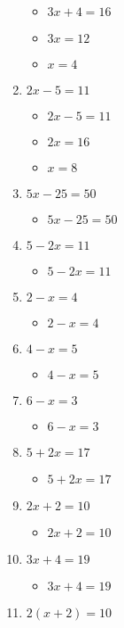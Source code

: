 \begin{enumerate}
  \begin{itemize}
  \item $3x+4=16$
  \item $3x=12$
  \item $x=4$
  \end{itemize}
\item $2x-5=11$
  \begin{itemize}
  \item $2x-5=11$
  \item $2x=16$
  \item $x=8$
  \end{itemize}
\item $5x-25=50$
  \begin{itemize}
  \item $5x-25=50$
  \end{itemize}
\item $5-2x=11$
  \begin{itemize}
  \item $5-2x=11$
  \end{itemize}
\item $2-x=4$
  \begin{itemize}
  \item $2-x=4$
  \end{itemize}
\item $4-x=5$
  \begin{itemize}
  \item $4-x=5$
  \end{itemize}
\item $6-x=3$
  \begin{itemize}
  \item $6-x=3$
  \end{itemize}
\item $5+2x=17$
  \begin{itemize}
  \item $5+2x=17$
  \end{itemize}
\item $2x+2=10$
  \begin{itemize}
  \item $2x+2=10$
  \end{itemize}
\item $3x+4=19$
  \begin{itemize}
  \item $3x+4=19$
  \end{itemize}
\item $2(x+2)=10$

\end{enumerate}
